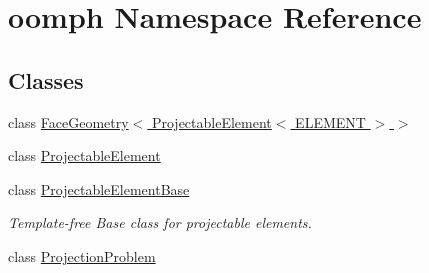 \hypertarget{namespaceoomph}{}\section{oomph Namespace Reference}
\label{namespaceoomph}
\subsection*{Classes}
\begin{DoxyCompactItemize}
\item 
class \hyperlink{classoomph_1_1FaceGeometry_3_01ProjectableElement_3_01ELEMENT_01_4_01_4}{Face\+Geometry$<$ Projectable\+Element$<$ E\+L\+E\+M\+E\+N\+T $>$ $>$}
\item 
class \hyperlink{classoomph_1_1ProjectableElement}{Projectable\+Element}
\item 
class \hyperlink{classoomph_1_1ProjectableElementBase}{Projectable\+Element\+Base}
\begin{DoxyCompactList}\small\item\em Template-\/free Base class for projectable elements. \end{DoxyCompactList}\item 
class \hyperlink{classoomph_1_1ProjectionProblem}{Projection\+Problem}
\end{DoxyCompactItemize}

